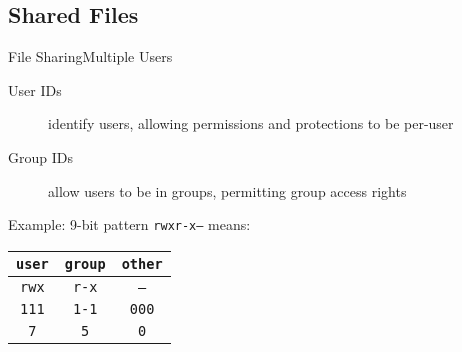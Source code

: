 \subsection{Shared Files}

\begin{frame}{File Sharing}{Multiple Users}
  \begin{description}
  \item[User IDs] identify users, allowing permissions and protections to be per-user
  \item[Group IDs] allow users to be in groups, permitting group access rights
  \end{description}
  \begin{block}{Example: 9-bit pattern}
    \texttt{rwxr-x---} means:
    \begin{center}
      \begin{tabular}{ccc}
        \texttt{user}&\texttt{group}&\texttt{other}\\\hline
        \texttt{rwx}&\texttt{r-x}&\texttt{---}\\
        \texttt{111}&\texttt{1-1}&\texttt{000}\\
        \texttt{7}&\texttt{5}&\texttt{0}
      \end{tabular}
    \end{center}
  \end{block}
\end{frame}

